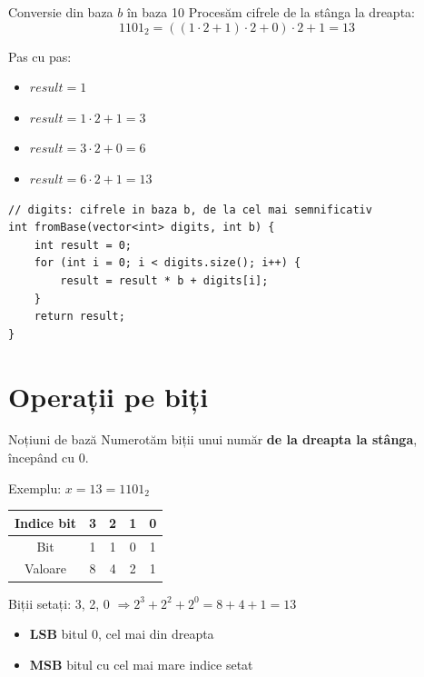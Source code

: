 \documentclass{beamer}
\begin{document}
\begin{frame}{Conversie din baza $b$ în baza 10}
  Procesăm cifrele de la stânga la dreapta:
  \[
    1101_2 = ((1 \cdot 2 + 1) \cdot 2 + 0) \cdot 2 + 1 = 13
  \]

  Pas cu pas:
  \begin{itemize}
    \item $result = 1$
    \item $result = 1 \cdot 2 + 1 = 3$
    \item $result = 3 \cdot 2 + 0 = 6$
    \item $result = 6 \cdot 2 + 1 = 13$ \checkmark
  \end{itemize}
  \begin{center}
  \begin{lstlisting}
// digits: cifrele in baza b, de la cel mai semnificativ
int fromBase(vector<int> digits, int b) {
    int result = 0;
    for (int i = 0; i < digits.size(); i++) {
        result = result * b + digits[i];
    }
    return result;
}
  \end{lstlisting}
  \end{center}
\end{frame}

\section{Operații pe biți}

\begin{frame}{Noțiuni de bază}
  Numerotăm biții unui număr \textbf{de la dreapta la stânga}, începând cu 0.

  \smallskip
  Exemplu: $x = 13 = 1101_2$
  \smallskip

  \begin{center}
  \begin{tabular}{ccccc}
    \toprule
    Indice bit & 3 & 2 & 1 & 0 \\
    \midrule
    Bit        & 1 & 1 & 0 & 1 \\
    \midrule
    Valoare    & 8 & 4 & 2 & 1 \\
    \bottomrule
  \end{tabular}
  \end{center}

  \medskip
  Biții setați: 3, 2, 0 \quad$\Rightarrow$\quad $2^3 + 2^2 + 2^0 = 8 + 4 + 1 = 13$
  \medskip
  \begin{itemize}
    \item \textbf{LSB} \textemdash{} bitul 0, cel mai din dreapta
    \item \textbf{MSB} \textemdash{} bitul cu cel mai mare indice setat
  \end{itemize}
\end{frame}
\end{document}
